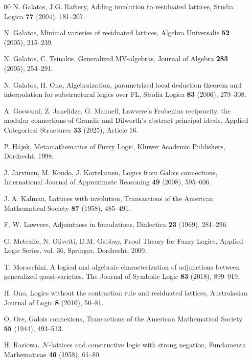 \documentclass[final,12pt,times]{elsarticle}
\theoremstyle{plain}
\theoremstyle{definition}
\theoremstyle{break}
\begin{document}
\begin{thebibliography}{00}
 N. Galatos, J.G. Raftery, Adding involution to residuated lattices, Studia Logica \textbf{77} (2004), 181--207.

 N. Galatos, Minimal varieties of residuated lattices, Algebra Universalis \textbf{52} (2005), 215--239.

 N. Galatos, C. Tsinakis, Generalized MV-algebras, Journal of Algebra \textbf{283} (2005), 254--291.

 N. Galatos, H. Ono, Algebraization, parametrized local deduction theorem and interpolation for substructural logics over FL, Studia Logica \textbf{83} (2006), 279--308.

 A. Goswami, Z. Janelidze, G. Manuell, Lawvere's Frobenius reciprocity, the modular connections of Grandis and Dilworth's abstract principal ideals, Applied Categorical Structures \textbf{33} (2025), Article 16.

 P. Hájek, Metamathematics of Fuzzy Logic, Kluwer Academic Publishers, Dordrecht, 1998.

 J. J\"arvinen, M. Kondo, J. Kortelainen, Logics from Galois connections, International Journal of Approximate Reasoning \textbf{49} (2008), 595--606.

 J. A. Kalman, Lattices with involution, Transactions of the American Mathematical Society \textbf{87} (1958), 485--491.

 F.  W. Lawvere, Adjointness in foundations, Dialectica \textbf{23} (1969), 281--296.

 G. Metcalfe, N. Olivetti, D.M. Gabbay, Proof Theory for Fuzzy Logics, Applied Logic Series, vol. 36, Springer, Dordrecht, 2009.

 T. Moraschini, A logical and algebraic characterization of adjunctions between generalized quasi-varieties, The Journal of Symbolic Logic \textbf{83} (2018), 899--919.

 H. Ono, Logics without the contraction rule and residuated lattices, Australasian Journal of Logic \textbf{8} (2010), 50--81.

 O. Ore, Galois connexions, Transactions of the American Mathematical Society \textbf{55} (1944), 493--513.

 H. Rasiowa, $\mathcal{N}$-lattices and constructive logic with strong negation, Fundamenta Mathematicae \textbf{46} (1958), 61--80.


\end{thebibliography}
\end{document}
